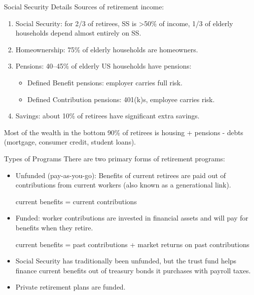 \documentclass[10pt]{extarticle}
\begin{document}
\begin{problem}{Social Security Details}
    Sources of retirement income:
    \begin{enumerate}[(1)]
      \item Social Security: for 2/3 of retirees, SS is >50\% of income, 1/3 of elderly households depend almost entirely on SS.
      \item Homeownership: 75\% of elderly households are homeowners.
      \item Pensions: 40--45\% of elderly US households have pensions:
        \begin{itemize}
          \item Defined Benefit pensions: employer carries full risk.
          \item Defined Contribution pensions: 401(k)s, employee carries risk.
        \end{itemize}
      \item Savings: about 10\% of retirees have significant extra savings.
    \end{enumerate}
    Most of the wealth in the bottom 90\% of retirees is housing + pensions - debts (mortgage, consumer credit, student loans).
  \end{problem}
  \begin{problem}{Types of Programs}
    There are two primary forms of retirement programs:
    \begin{itemize}
      \item Unfunded (pay-as-you-go): Benefits of current retirees are paid out of contributions from current workers (also known as a generational link).
        \begin{center}
          current benefits = current contributions
        \end{center}
      \item Funded: worker contributions are invested in financial assets and will pay for benefits when they retire.
        \begin{center}
          current benefits = past contributions + market returns on past contributions
        \end{center}
      \item Social Security has traditionally been unfunded, but the trust fund helps finance current benefits out of treasury bonds it purchases with payroll taxes.
      \item Private retirement plans are funded.
    \end{itemize}
  \end{problem}
\end{document}
